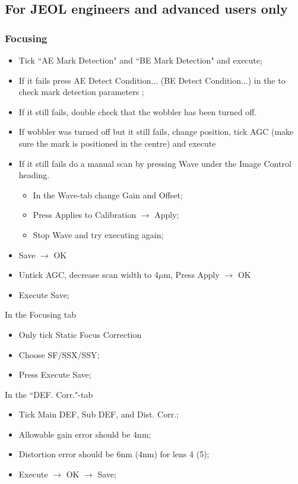 \subsection{For JEOL engineers and advanced users only}

\subsubsection{Focusing}
\begin{itemize}
\item Tick ``AE Mark Detection" and ``BE Mark Detection" and execute;
\item  If  it  fails  press {AE  Detect  Condition...}   ({BE  Detect
    Condition...})  in  the to  check mark detection  parameters \ira
  ;
\item  If it  still fails,  double check  that the  wobbler has  been
  turned off.
\item If wobbler was turned off  but it still fails, change position,
  tick  AGC (make  sure the  mark is  positioned in  the centre)  and
  execute
\item If it still fails do a manual scan by pressing {Wave} under the
  {Image Control} heading.
  \begin{itemize}
  \item In the {Wave}-tab change Gain and Offset;
  \item   Press   {Applies   to  Calibration}   
    $\rightarrow$ Apply;
  \item Stop Wave and try executing again;
  \end{itemize}
\item Save $\rightarrow$ OK
\item  Untick  AGC,  decrease  scan width  to  4$\mu$m,  Press  Apply
  $\rightarrow$ OK
\item Execute \ira Save;
\end{itemize}
In the {Focusing} tab
\begin{itemize}
\item Only tick {Static Focus Correction}
\item Choose SF/SSX/SSY;
\item Press Execute \ira Save;
\end{itemize}
In the ``DEF. Corr."-tab
\begin{itemize}
\item Tick {Main DEF}, {Sub DEF}, and {Dist. Corr.};
\item Allowable gain error should be 4nm;
\item Distortion error should be 6nm (4nm) for lens 4 (5);
\item Execute $\rightarrow$ OK $\rightarrow$ Save;
\end{itemize}

